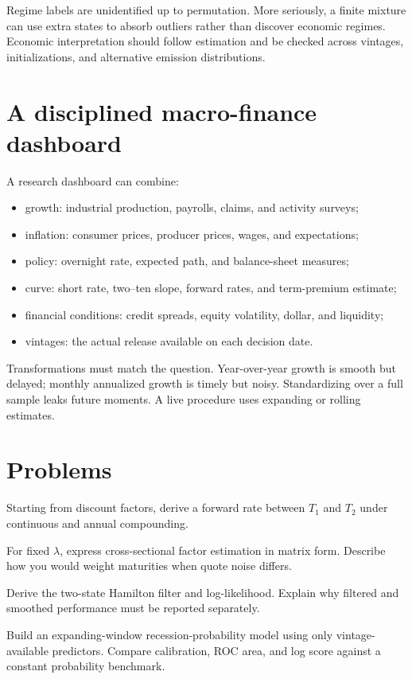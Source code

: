 Regime labels are unidentified up to permutation. More seriously, a finite mixture
can use extra states to absorb outliers rather than discover economic regimes.
Economic interpretation should follow estimation and be checked across vintages,
initializations, and alternative emission distributions.

\section{A disciplined macro-finance dashboard}

A research dashboard can combine:

\begin{itemize}
\item growth: industrial production, payrolls, claims, and activity surveys;
\item inflation: consumer prices, producer prices, wages, and expectations;
\item policy: overnight rate, expected path, and balance-sheet measures;
\item curve: short rate, two--ten slope, forward rates, and term-premium estimate;
\item financial conditions: credit spreads, equity volatility, dollar, and liquidity;
\item vintages: the actual release available on each decision date.
\end{itemize}

Transformations must match the question. Year-over-year growth is smooth but delayed;
monthly annualized growth is timely but noisy. Standardizing over a full sample leaks
future moments. A live procedure uses expanding or rolling estimates.

\section{Problems}

\begin{exercise}
Starting from discount factors, derive a forward rate between $T_1$ and $T_2$ under
continuous and annual compounding.
\end{exercise}
\begin{exercise}
For fixed $\lambda$, express cross-sectional factor estimation in matrix form.
Describe how you would weight maturities when quote noise differs.
\end{exercise}
\begin{exercise}
Derive the two-state Hamilton filter and log-likelihood. Explain why filtered and
smoothed performance must be reported separately.
\end{exercise}
\begin{exercise}[Research]
Build an expanding-window recession-probability model using only vintage-available
predictors. Compare calibration, ROC area, and log score against a constant
probability benchmark.
\end{exercise}
